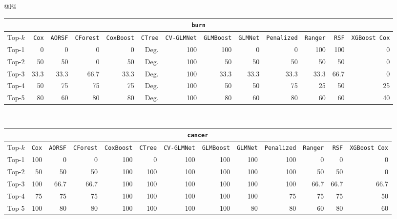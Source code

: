 \begin{longtable}{@{}l@{}}
\begin{tabular}{@{}l*{12}{r}@{}}
\multicolumn{13}{c}{\texttt{burn}} \\
\midrule
Top-$k$ & \texttt{Cox} & \texttt{AORSF} & \texttt{CForest} & \texttt{CoxBoost} & \texttt{CTree} & \texttt{CV-GLMNet} & \texttt{GLMBoost} & \texttt{GLMNet} & \texttt{Penalized} & \texttt{Ranger} & \texttt{RSF} & \texttt{XGBoost Cox} \\
\midrule
Top-1 & 0 & 0 & 0 & 0 & Deg. & 100 & 100 & 0 & 0 & 100 & 100 & 0 \\
Top-2 & 50 & 50 & 0 & 50 & Deg. & 100 & 50 & 50 & 50 & 50 & 50 & 0 \\
Top-3 & 33.3 & 33.3 & 66.7 & 33.3 & Deg. & 100 & 33.3 & 33.3 & 33.3 & 33.3 & 66.7 & 0 \\
Top-4 & 50 & 75 & 75 & 75 & Deg. & 100 & 50 & 50 & 75 & 25 & 50 & 25 \\
Top-5 & 80 & 60 & 80 & 80 & Deg. & 100 & 80 & 60 & 80 & 60 & 60 & 40 \\
\end{tabular} \\
\midrule

\begin{tabular}{@{}l*{12}{r}@{}}
\multicolumn{13}{c}{\texttt{cancer}} \\
\midrule
Top-$k$ & \texttt{Cox} & \texttt{AORSF} & \texttt{CForest} & \texttt{CoxBoost} & \texttt{CTree} & \texttt{CV-GLMNet} & \texttt{GLMBoost} & \texttt{GLMNet} & \texttt{Penalized} & \texttt{Ranger} & \texttt{RSF} & \texttt{XGBoost Cox} \\
\midrule
Top-1 & 100 & 0 & 0 & 100 & 0 & 100 & 100 & 100 & 100 & 0 & 0 & 0 \\
Top-2 & 50 & 50 & 50 & 100 & 100 & 100 & 100 & 100 & 100 & 50 & 50 & 0 \\
Top-3 & 100 & 66.7 & 66.7 & 100 & 100 & 100 & 100 & 100 & 100 & 66.7 & 66.7 & 66.7 \\
Top-4 & 75 & 75 & 75 & 100 & 100 & 100 & 100 & 100 & 75 & 75 & 75 & 50 \\
Top-5 & 100 & 80 & 80 & 100 & 100 & 100 & 100 & 80 & 80 & 60 & 80 & 60 \\
\end{tabular} \\
\midrule


\end{longtable}
